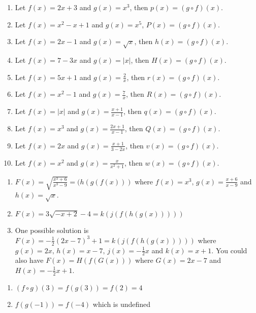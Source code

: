 \begin{enumerate}
\setcounter{enumi}{\value{HW}}

\item  Let $f(x) = 2x+3$ and $g(x) = x^3$, then $p(x) = (g\circ f)(x)$.
\item Let $f(x) = x^2-x+1$ and $g(x) = x^5$,  $P(x) =(g\circ f)(x)$.
\item  Let $f(x) = 2x-1$ and $g(x) = \sqrt{x}$, then $h(x) = (g\circ f)(x)$.
\item Let $f(x) = 7-3x$ and $g(x) = |x|$, then  $H(x) =  (g\circ f)(x)$.
\item  Let $f(x) = 5x+1$ and $g(x) = \frac{2}{x}$, then $r(x) =(g\circ f)(x)$.
\item  Let $f(x) = x^2-1$ and $g(x) = \frac{7}{x}$, then $R(x) =(g\circ f)(x)$.
\item  Let $f(x) = |x|$ and $g(x) = \frac{x+1}{x-1}$, then  $q(x) =(g\circ f)(x)$.

\item Let $f(x) = x^3$ and $g(x)= \frac{2x+1}{x-1}$, then  $Q(x) =(g\circ f)(x)$.

\item Let $f(x) =2x$ and $g(x) = \frac{x+1}{3-2x}$, then  $v(x) =(g\circ f)(x)$.

\item  Let $f(x) = x^2$ and $g(x) = \frac{x}{x^2+1}$, then  $w(x) =(g\circ f)(x)$.

\setcounter{HW}{\value{enumi}}
\end{enumerate}

\begin{enumerate}
\setcounter{enumi}{\value{HW}}

\item $F(x) = \sqrt{\frac{x^{3} + 6}{x^{3} - 9}} = (h(g(f(x)))$ where $f(x) = x^{3}, \, g(x) = \frac{x + 6}{x - 9}$ and $h(x) = \sqrt{x}$.

\item $F(x) = 3\sqrt{-x + 2} - 4 = k(j(f(h(g(x)))))$

\item One possible solution is $F(x) = -\frac{1}{2}(2x - 7)^{3} + 1 = k(j(f(h(g(x)))))$ where $g(x) = 2x, \, h(x) = x - 7, \, j(x) = -\frac{1}{2}x$ and $k(x) = x + 1$.  You could also have $F(x) = H(f(G(x)))$ where $G(x) = 2x - 7$ and $H(x) = -\frac{1}{2}x + 1$.

\setcounter{HW}{\value{enumi}}
\end{enumerate}


\begin{multicols}{2}
\begin{enumerate}
\setcounter{enumi}{\value{HW}}

\item $(f \circ g)(3)= f(g(3)) = f(2) = 4$
\item $f(g(-1)) = f(-4)$ which is undefined

\setcounter{HW}{\value{enumi}}
\end{enumerate}
\end{multicols}

